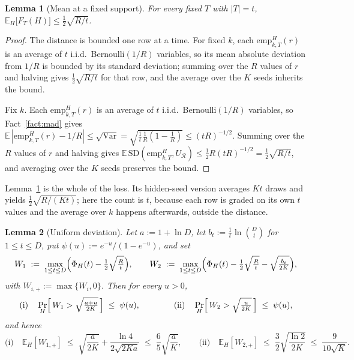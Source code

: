 \documentclass[11pt,a4paper]{article}
\theoremstyle{plain}
\newtheorem{lemma}{Lemma}
\theoremstyle{definition}
\theoremstyle{remark}
\newcommand{\SD}{\mathrm{SD}}
\newcommand{\calR}{\mathcal{R}}
\newcommand{\emp}{\mathrm{emp}}
\begin{document}
\begin{lemma}[Mean at a fixed support]\label{lem:mean}
For every fixed $T$ with $|T| = t$, \;
$\mathbb{E}_{H}\bigl[F_{T}(H)\bigr] \le \tfrac12 \sqrt{R/t}$.
\end{lemma}

\begin{proof}
The distance is bounded one row at a time. For fixed $k$, each $\emp^{H}_{k,T}(r)$ is an average of
$t$ i.i.d.\ Bernoulli$(1/R)$ variables, so its mean absolute deviation from $1/R$ is bounded by its
standard deviation; summing over the $R$ values of $r$ and halving gives $\tfrac12\sqrt{R/t}$ for
that row, and the average over the $K$ seeds inherits the bound.

Fix $k$. Each $\emp^{H}_{k,T}(r)$ is an average of $t$ i.i.d.\ Bernoulli$(1/R)$
variables, so Fact~\ref{fact:mad} gives $\mathbb{E}\,|\emp^{H}_{k,T}(r) - 1/R| \le \sqrt{\operatorname{Var}} =
\sqrt{\tfrac{1}{t}\tfrac1R(1-\tfrac1R)} \le (tR)^{-1/2}$. Summing over the $R$ values of $r$ and
halving gives $\mathbb{E}\,\SD(\emp^{H}_{k,T},U_{\calR}) \le \tfrac12 R (tR)^{-1/2} =
\tfrac12\sqrt{R/t}$, and averaging over the $K$ seeds preserves the bound.
\end{proof}

Lemma~\ref{lem:mean} is the whole of the loss. Its hidden-seed version averages $Kt$ draws and
yields $\tfrac12\sqrt{R/(Kt)}$; here the count is $t$, because each row is graded on its own $t$
values and the average over $k$ happens afterwards, outside the distance.

\begin{lemma}[Uniform deviation]\label{lem:unif}
Let $a := 1 + \ln D$, let $b_{t} := \tfrac1t \ln\binom{D}{t}$ for $1 \le t \le D$, put
$\psi(u) := e^{-u}/(1-e^{-u})$, and set
\[
  W_{1} \;:=\; \max_{1 \le t \le D}\Bigl(\Phi_{H}(t) - \tfrac12\sqrt{\tfrac{R}{t}}\Bigr),
  \qquad
  W_{2} \;:=\; \max_{1 \le t \le D}\Bigl(\Phi_{H}(t) - \tfrac12\sqrt{\tfrac{R}{t}}
                                          - \sqrt{\tfrac{b_{t}}{2K}}\Bigr),
\]
with $W_{i,+} := \max\{W_{i}, 0\}$. Then for every $u > 0$,
\[
  \text{(i)}\quad \Pr_{H}\Bigl[\, W_{1} > \sqrt{\tfrac{a+u}{2K}} \,\Bigr] \;\le\; \psi(u) ,
  \qquad\qquad
  \text{(ii)}\quad \Pr_{H}\Bigl[\, W_{2} > \sqrt{\tfrac{u}{2K}} \,\Bigr] \;\le\; \psi(u) ,
\]
and hence
\[
  \text{(i)}\quad
  \mathbb{E}_{H}[W_{1,+}] \;\le\; \sqrt{\frac{a}{2K}} + \frac{\ln 4}{2\sqrt{2Ka}}
  \;\le\; \frac{6}{5}\sqrt{\frac{a}{K}} ,
  \qquad
  \text{(ii)}\quad
  \mathbb{E}_{H}[W_{2,+}] \;\le\; \frac{3}{2}\sqrt{\frac{\ln 2}{2K}} \;\le\; \frac{9}{10\sqrt{K}} .
\]
\end{lemma}
\end{document}

